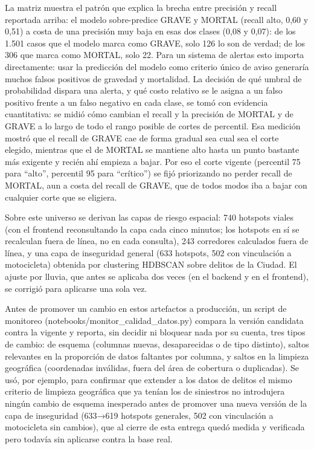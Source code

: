 La matriz muestra el patrón que explica la brecha entre precisión y
recall reportada arriba: el modelo sobre-predice GRAVE y MORTAL (recall
alto, 0,60 y 0,51) a costa de una precisión muy baja en esas dos clases
(0,08 y 0,07): de los 1.501 casos que el modelo marca como GRAVE, solo
126 lo son de verdad; de los 306 que marca como MORTAL, solo 22. Para un
sistema de alertas esto importa directamente: usar la predicción del
modelo como criterio único de aviso generaría muchos falsos positivos de
gravedad y mortalidad. La decisión de qué umbral de probabilidad dispara
una alerta, y qué costo relativo se le asigna a un falso positivo frente
a un falso negativo en cada clase, se tomó con evidencia cuantitativa:
se midió cómo cambian el recall y la precisión de MORTAL y de GRAVE a lo
largo de todo el rango posible de cortes de percentil. Esa medición
mostró que el recall de GRAVE cae de forma gradual sea cual sea el corte
elegido, mientras que el de MORTAL se mantiene alto hasta un punto
bastante más exigente y recién ahí empieza a bajar. Por eso el corte
vigente (percentil 75 para ``alto'', percentil 95 para ``crítico'') se
fijó priorizando no perder recall de MORTAL, aun a costa del recall de
GRAVE, que de todos modos iba a bajar con cualquier corte que se
eligiera.

Sobre este universo se derivan las capas de riesgo espacial: 740
hotspots viales (con el frontend reconsultando la capa cada cinco
minutos; los hotspots en sí se recalculan fuera de línea, no en cada
consulta), 243 corredores calculados fuera de línea, y una capa de
inseguridad general (633 hotspots, 502 con vinculación a motocicleta)
obtenida por clustering HDBSCAN sobre delitos de la Ciudad. El ajuste
por lluvia, que antes se aplicaba dos veces (en el backend y en el
frontend), se corrigió para aplicarse una sola vez.

Antes de promover un cambio en estos artefactos a producción, un script
de monitoreo (notebooks/monitor\_calidad\_datos.py) compara la versión
candidata contra la vigente y reporta, sin decidir ni bloquear nada por
su cuenta, tres tipos de cambio: de esquema (columnas nuevas,
desaparecidas o de tipo distinto), saltos relevantes en la proporción de
datos faltantes por columna, y saltos en la limpieza geográfica
(coordenadas inválidas, fuera del área de cobertura o duplicadas). Se
usó, por ejemplo, para confirmar que extender a los datos de delitos el
mismo criterio de limpieza geográfica que ya tenían los de siniestros no
introdujera ningún cambio de esquema inesperado antes de promover una
nueva versión de la capa de inseguridad (633→619 hotspots generales, 502
con vinculación a motocicleta sin cambios), que al cierre de esta
entrega quedó medida y verificada pero todavía sin aplicarse contra la
base real.

